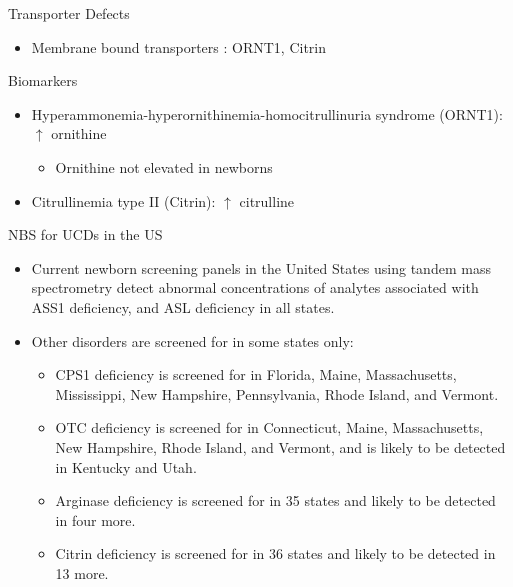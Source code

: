 \documentclass[presentation, smaller]{beamer}
\begin{document}
\begin{frame}[label={sec:orgheadline12}]{Transporter Defects}
\begin{itemize}
\item Membrane bound transporters : ORNT1, Citrin
\end{itemize}

\begin{block}{Biomarkers}
\begin{itemize}
\item Hyperammonemia-hyperornithinemia-homocitrullinuria syndrome (ORNT1): \(\uparrow\) ornithine
\begin{itemize}
\item Ornithine not elevated in newborns
\end{itemize}
\item Citrullinemia type II (Citrin): \(\uparrow\) citrulline
\end{itemize}
\end{block}
\end{frame}

\begin{frame}[label={sec:orgheadline13}]{NBS for UCDs in the US}
\begin{itemize}
\item Current newborn screening panels in the United States using tandem
mass spectrometry detect abnormal concentrations of analytes
associated with ASS1 deficiency, and ASL deficiency in all states.

\item Other disorders are screened for in some states only:
\begin{itemize}
\item CPS1 deficiency is screened for in Florida, Maine, Massachusetts,
Mississippi, New Hampshire, Pennsylvania, Rhode Island, and
Vermont.
\item OTC deficiency is screened for in Connecticut, Maine,
Massachusetts, New Hampshire, Rhode Island, and Vermont, and is
likely to be detected in Kentucky and Utah.
\item Arginase deficiency is screened for in 35 states and likely to be
detected in four more.
\item Citrin deficiency is screened for in 36 states and likely to be
detected in 13 more.
\end{itemize}
\end{itemize}
\end{frame}
\end{document}
